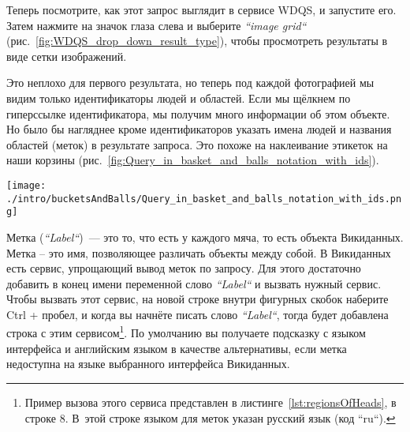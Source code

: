 Теперь посмотрите, как этот запрос выглядит в сервисе WDQS, и запустите его. Затем нажмите на значок глаза слева и выберите \textit{``image grid``} (рис.~\ref{fig:WDQS_drop_down_result_type}), чтобы просмотреть результаты в виде сетки изображений.

\begin{marginfigure}
	{
		\setlength{\fboxsep}{0pt}%
		\setlength{\fboxrule}{1pt}%
	}
    \caption[Выбор отображения результатов запроса в виде сетки изображений.]{Выбор отображения результатов запроса в виде \textit{``image grid``} (сетки изображений).}
	\label{fig:WDQS_drop_down_result_type}
\end{marginfigure}

Это неплохо для первого результата, но теперь под каждой фотографией мы видим только идентификаторы людей и областей. Если мы щёлкнем по гиперссылке идентификатора, мы получим много информации об этом объекте. Но было бы нагляднее кроме идентификаторов указать имена людей и названия областей (меток) в результате запроса. Это похоже на наклеивание этикеток на наши корзины (рис.~\ref{fig:Query_in_basket_and_balls_notation_with_ids}).

\begin{figure*}[h!]
\texttt{[image: ./intro/bucketsAndBalls/Query\_in\_basket\_and\_balls\_notation\_with\_ids.png]}
\caption{Запрос в нотации <<Корзины и мячи>> с номерами свойств и объектов Викиданных.}
\label{fig:Query_in_basket_and_balls_notation_with_ids}
\end{figure*}

\newpage
Метка (\textit{``Label``})~--- это то, что есть у каждого мяча, то есть объекта Викиданных. Метка – это имя, позволяющее различать объекты между собой. В Викиданных есть сервис, упрощающий вывод меток по запросу. Для этого достаточно добавить в конец имени переменной слово \textit{``Label``} и вызвать нужный сервис. Чтобы вызвать этот сервис, на новой строке внутри фигурных скобок наберите Ctrl + пробел, и когда вы начнёте писать слово \textit{``Label``}, тогда будет добавлена строка с этим сервисом\footnote[][12pt]{Пример вызова этого сервиса представлен в листинге~\ref{lst:regionsOfHeads}, в строке 8. В~этой строке языком для меток указан русский язык (код ``ru``).}. По умолчанию вы получаете подсказку с языком интерфейса и английским языком в качестве альтернативы, если метка недоступна на языке выбранного интерфейса Викиданных.

